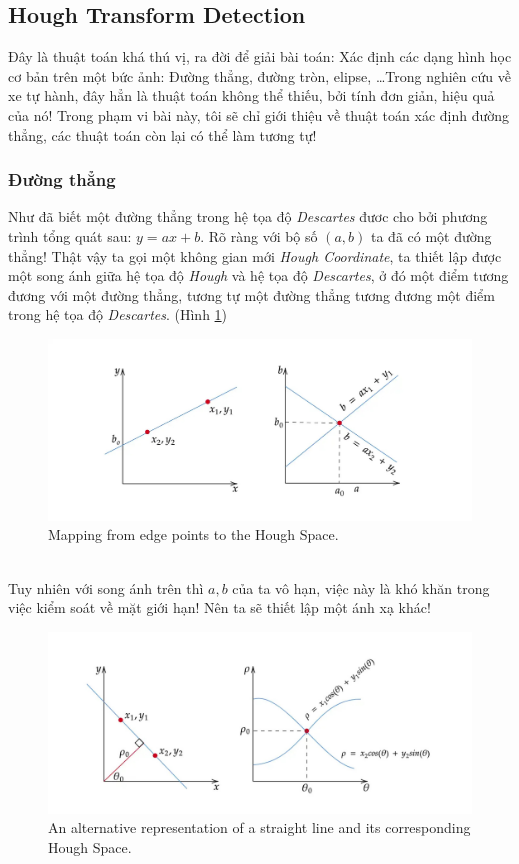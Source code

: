 \documentclass{article}
\begin{document}
    \subsection{Hough Transform Detection}
    Đây là thuật toán khá thú vị, ra đời để giải bài toán: Xác định các dạng hình học cơ bản trên một bức ảnh: Đường thẳng, đường tròn, elipse, \ldots Trong nghiên cứu về xe tự hành, đây hẳn là thuật toán không thể thiếu, bởi tính đơn giản, hiệu quả của nó! Trong phạm vi bài này, tôi sẽ chỉ giới thiệu về thuật toán xác định đường thẳng, các thuật toán còn lại có thể làm tương tự!
    \subsubsection{Đường thẳng}
    Như đã biết một đường thẳng trong hệ tọa độ \textit{Descartes} đươc cho bởi phương trình tổng quát sau: $y = ax+b$. Rõ ràng với bộ số $(a,b)$ ta đã có một đường thẳng! Thật vậy ta gọi một không gian mới \textit{Hough Coordinate}, ta thiết lập được một song ánh giữa hệ tọa độ \textit{Hough} và hệ tọa độ \textit{Descartes}, ở đó một điểm tương đương với một đường thẳng, tương tự một đường thẳng tương đương một điểm trong hệ tọa độ \textit{Descartes}. (Hình \ref{fig16})
    \begin{figure}[ht!]
        \centering
        \includegraphics[width = 0.7\linewidth]{fig15.jpg}
        \caption{Mapping from edge points to the Hough Space.}
        \label{fig16}
    \end{figure}
    \phantom{a}\\
    Tuy nhiên với song ánh trên thì $a, b$ của ta vô hạn, việc này là khó khăn trong việc kiểm soát về mặt giới hạn! Nên ta sẽ thiết lập một ánh xạ khác! 
    \begin{figure}[ht!]
        \centering
        \includegraphics[width = 0.7\linewidth]{fig16.jpg}
        \caption{An alternative representation of a straight line and its corresponding Hough Space.}
        \label{fig17}
    \end{figure}
\end{document}
